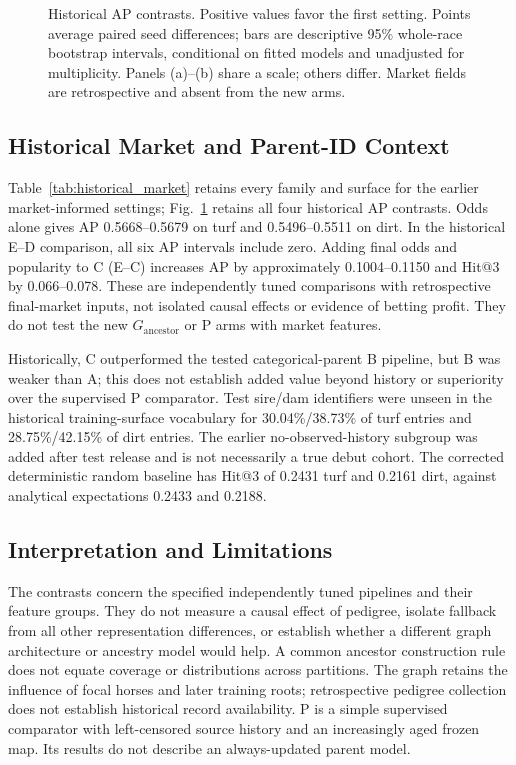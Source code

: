 \begin{figure}[!t]
\centering

\caption{Historical AP contrasts. Positive values favor the first setting. Points average paired seed differences; bars are descriptive 95\% whole-race bootstrap intervals, conditional on fitted models and unadjusted for multiplicity. Panels (a)--(b) share a scale; others differ. Market fields are retrospective and absent from the new arms.}
\label{fig:historical_contrasts}
\end{figure}

\subsection{Historical Market and Parent-ID Context}

Table~\ref{tab:historical_market} retains every family and surface for the earlier market-informed settings; Fig.~\ref{fig:historical_contrasts} retains all four historical AP contrasts. Odds alone gives AP 0.5668--0.5679 on turf and 0.5496--0.5511 on dirt. In the historical E--D comparison, all six AP intervals include zero. Adding final odds and popularity to C (E--C) increases AP by approximately 0.1004--0.1150 and Hit@3 by 0.066--0.078. These are independently tuned comparisons with retrospective final-market inputs, not isolated causal effects or evidence of betting profit. They do not test the new $G_{\mathrm{ancestor}}$ or P arms with market features.





Historically, C outperformed the tested categorical-parent B pipeline, but B was weaker than A; this does not establish added value beyond history or superiority over the supervised P comparator. Test sire/dam identifiers were unseen in the historical training-surface vocabulary for 30.04\%/38.73\% of turf entries and 28.75\%/42.15\% of dirt entries. The earlier no-observed-history subgroup was added after test release and is not necessarily a true debut cohort. The corrected deterministic random baseline has Hit@3 of 0.2431 turf and 0.2161 dirt, against analytical expectations 0.2433 and 0.2188.

\subsection{Interpretation and Limitations}
The contrasts concern the specified independently tuned pipelines and their feature groups. They do not measure a causal effect of pedigree, isolate fallback from all other representation differences, or establish whether a different graph architecture or ancestry model would help. A common ancestor construction rule does not equate coverage or distributions across partitions. The graph retains the influence of focal horses and later training roots; retrospective pedigree collection does not establish historical record availability. P is a simple supervised comparator with left-censored source history and an increasingly aged frozen map. Its results do not describe an always-updated parent model.

